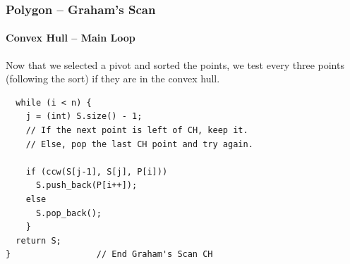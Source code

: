 \begin{frame}[fragile]
  \frametitle{Polygon -- Graham's Scan}
  \framesubtitle{Convex Hull -- Main Loop}

Now that we selected a pivot and sorted the points, we test every three points (following the sort) if they are in the convex hull.

  {\small
    \begin{exampleblock}{}
\begin{verbatim}
  while (i < n) {
    j = (int) S.size() - 1;
    // If the next point is left of CH, keep it.
    // Else, pop the last CH point and try again.

    if (ccw(S[j-1], S[j], P[i]))
      S.push_back(P[i++]);
    else
      S.pop_back();
    }
  return S;
}                 // End Graham's Scan CH
\end{verbatim}
\end{exampleblock}}
\end{frame}
